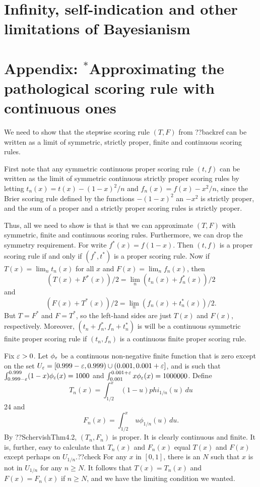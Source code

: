 \section{Infinity, self-indication and other limitations of Bayesianism}

\section*{Appendix: $^*$Approximating the pathological scoring rule with continuous ones}
We need to show that the stepwise scoring rule $(T,F)$ from ??backref can be written as a limit of
symmetric, strictly proper, finite and continuous scoring rules. 

First note that any symmetric continuous proper scoring rule $(t,f)$ can be written as the limit of symmetric continuous
strictly proper scoring rules by letting $t_n(x)=t(x)-(1-x)^2/n$ and $f_n(x)=f(x)-x^2/n$, since the Brier scoring rule defined
by the functions $-(1-x)^2$ an $-x^2$ is strictly proper, and the sum of a proper and a strictly proper scoring rules is
strictly proper. 

Thus, all we need to show is that is that we can approximate $(T,F)$ with symmetric, finite and continuous scoring rules.
Furthermore, we can drop the symmetry requirement. For write $f^*(x)=f(1-x)$. Then $(t,f)$ is a proper scoring rule if and
only if $(f^*,t^*)$ is a proper scoring rule. Now if $T(x)=\lim_n t_n(x)$ for all $x$ and $F(x)=\lim_n f_n(x)$, then
$$
    (T(x)+F^*(x))/2 = \lim_n (t_n(x)+f_n^*(x))/2
$$    
    and
$$    
    (F(x)+T^*(x))/2 = \lim_n (f_n(x)+t_n^*(x))/2. 
$$    
But $T=F^*$ and $F=T^*$, so the left-hand sides are just $T(x)$ and $F(x)$, respectively. Moreover, $(t_n+f_n^*,f_n+t_n^*)$ is 
will be a continuous symmetric finite proper scoring rule if $(t_n,f_n)$ is a continuous finite proper scoring rule.

Fix $\varepsilon>0$. Let $\phi_\varepsilon$ be a continuous non-negative finite function that is zero except on the set $U_\varepsilon=[0.999-\varepsilon,0.999)\cup (0.001,0.001+\varepsilon]$, 
and is such that $\int_{0.999-\varepsilon}^{0.999} (1-x) \phi_\varepsilon(x) = 1000$ and $\int_{0.001}^{0.001+\varepsilon} x \phi_\varepsilon(x) = 1000000$. 
Define 
$$
    T_n(x) = \int_{1/2}^x \, (1-u)phi_{1/n}(u) \, du
$$24
and 
$$
    F_n(x) = \int_{1/2}^x \, u \phi_{1/n}(u) \, du.
$$
By ??SchervishThm4.2, $(T_n,F_n)$ is proper. It is clearly continuous and finite. It is, further, easy to calculate that 
$T_n(x)$ and $F_n(x)$ equal $T(x)$ and $F(x)$ except perhaps on $U_{1/n}$.??check For any $x$ in $[0,1]$, there is an $N$
such that $x$ is not in $U_{1/n}$ for any $n\ge N$. It follows that $T(x)=T_n(x)$ and $F(x)=F_n(x)$ if $n\ge N$, and we have
the limiting condition we wanted.

\chaptertail 


